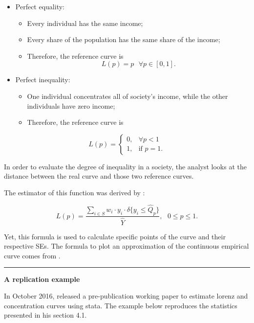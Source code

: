 \documentclass[]{book}
\providecommand{\tightlist}{%
  \setlength{\itemsep}{0pt}\setlength{\parskip}{0pt}}
\begin{document}
\begin{itemize}
\tightlist
\item
  Perfect equality:

  \begin{itemize}
  \tightlist
  \item
    Every individual has the same income;
  \item
    Every share of the population has the same share of the income;
  \item
    Therefore, the reference curve is \[L(p) = p \text{ } \forall p \in [0,1] \text{.}\]
  \end{itemize}
\item
  Perfect inequality:

  \begin{itemize}
  \tightlist
  \item
    One individual concentrates all of society's income, while the other individuals have zero income;
  \item
    Therefore, the reference curve is
  \end{itemize}
\end{itemize}

\[
L(p)=
\begin{cases}
0, &\forall p < 1 \\
1, &\text{if } p = 1 \text{.}
\end{cases}
\]

In order to evaluate the degree of inequality in a society, the analyst looks at the distance between the real curve and those two reference curves.

The estimator of this function was derived by \citet{kovacevic1997}:

\[
L(p) = \frac{ \sum_{i \in S} w_i \cdot y_i \cdot \delta \{ y_i \le \widehat{Q}_p \}}{\widehat{Y}}, \text{ } 0 \le p \le 1.
\]

Yet, this formula is used to calculate specific points of the curve and their respective SEs. The formula to plot an approximation of the continuous empirical curve comes from \citet{lerman1989}.

\begin{center}\rule{0.5\linewidth}{0.5pt}\end{center}

\textbf{A replication example}

In October 2016, \citep{jann2016} released a pre-publication working paper to estimate lorenz and concentration curves using stata. The example below reproduces the statistics presented in his section 4.1.
\end{document}
